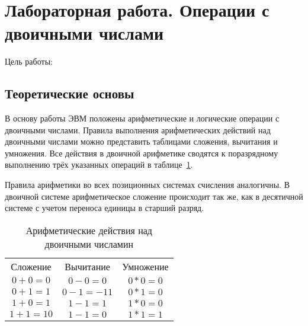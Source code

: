 \documentclass[a4paper]{article}
\begin{document}
\section{Лабораторная работа. Операции с двоичными числами}

Цель работы:

\subsection{Теоретические основы}

В основу работы ЭВМ положены арифметические и логические операции с двоичными числами. Правила выполнения арифметических действий над двоичными числами можно представить таблицами сложения, вычитания и умножения. Все действия в двоичной арифметике сводятся к поразрядному выполнению трёх указанных операций в таблице~\ref{tab:mytab}.

Правила арифметики во всех позиционных системах счисления аналогичны. В двоичной системе арифметическое сложение происходит так же, как в десятичной системе с учетом переноса единицы в старший разряд.

\begin{table}[h]
  \caption{Арифметические действия над двоичными числамин}
  \begin{center}\label{tab:mytab}
   \begin{tabular}{c|c|c}
     Сложение & Вычитание & Умножение \\
     $0 + 0 = 0$ & $0 - 0 = 0$ & $0 * 0 = 0$\\
     $0 + 1 = 1$ & $0 - 1 = -11$ & $0 * 1 = 0$\\
     $1 + 0 = 1$ & $1 - 1 = 1$ & $1 * 0 = 0$\\
     $1 + 1 = 10$ & $1 - 1 = 0$ & $1 * 1 = 1$\\
     \end{tabular}
  \end{center}       
\end{table}
\end{document}
